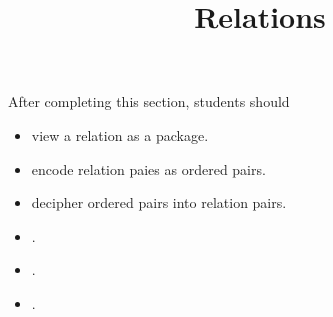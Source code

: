 \documentclass{ximera}
\title{Relations}
\begin{document}
\begin{abstract}
\end{abstract}
\maketitle

\begin{sectionOutcomes}
After completing this section, students should 

\begin{itemize}
\item view a relation as a package.
\item encode relation paies as ordered pairs.
\item decipher ordered pairs into relation pairs.
\item .
\item .
\item .
\end{itemize}
\end{sectionOutcomes}
\end{document}

